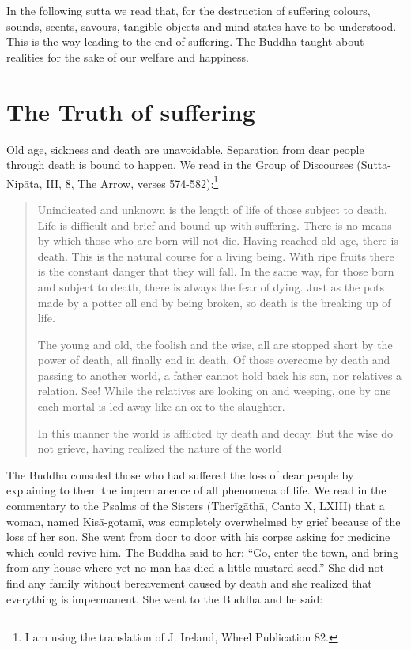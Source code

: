 \documentclass{book}
\begin{document}
In the following sutta we read that, for the destruction of suffering
colours, sounds, scents, savours, tangible objects and mind-states have
to be understood. This is the way leading to the end of suffering. The
Buddha taught about realities for the sake of our welfare and happiness.

\chapter{The Truth of suffering}

Old age, sickness and death are unavoidable. Separation from dear people
through death is bound to happen. We read in the Group of Discourses
(Sutta-Nipāta, III, 8, The Arrow, verses 574-582):\footnote{ I am using
  the translation of J. Ireland, Wheel Publication 82.}

\begin{quote}
Unindicated and unknown is the length of life of those subject to death.
Life is difficult and brief and bound up with suffering. There is no
means by which those who are born will not die. Having reached old age,
there is death. This is the natural course for a living being. With ripe
fruits there is the constant danger that they will fall. In the same
way, for those born and subject to death, there is always the fear of
dying. Just as the pots made by a potter all end by being broken, so
death is the breaking up of life.

The young and old, the foolish and the wise, all are stopped short by
the power of death, all finally end in death. Of those overcome by death
and passing to another world, a father cannot hold back his son, nor
relatives a relation. See! While the relatives are looking on and
weeping, one by one each mortal is led away like an ox to the slaughter.

In this manner the world is afflicted by death and decay. But the wise
do not grieve, having realized the nature of the world
\end{quote}

The Buddha consoled those who had suffered the loss of dear people by
explaining to them the impermanence of all phenomena of life. We read in
the commentary to the Psalms of the Sisters (Therīgāthā, Canto X, LXIII)
that a woman, named Kisā-gotamī, was completely overwhelmed by grief
because of the loss of her son. She went from door to door with his
corpse asking for medicine which could revive him. The Buddha said to
her: ``Go, enter the town, and bring from any house where yet no man has
died a little mustard seed.'' She did not find any family without
bereavement caused by death and she realized that everything is
impermanent. She went to the Buddha and he said:
\end{document}
